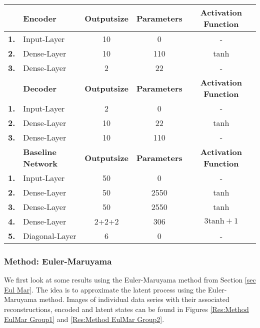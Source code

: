 \documentclass[11pt,titlepage]{article}
\theoremstyle{definition}
\theoremstyle{remark}
\begin{document}
	\begin{table}[htb]
		\begin{center}
			\begin{tabular}{llccc}
				\toprule
				\toprule
				\textbf{\ }	&\textbf{Encoder}	&\textbf{Outputsize} &\textbf{Parameters}  &\textbf{Activation Function}\\
				\midrule
				\textbf{1.}	&Input-Layer	& 10		& 0		&- \\
				\textbf{2.}	&Dense-Layer	& 10		& 110	&tanh \\
				\textbf{3.}	&Dense-Layer	& 2			& 22	&- \\
				\bottomrule
				\toprule
				\textbf{\ }	&\textbf{Decoder}	&\textbf{Outputsize} &\textbf{Parameters} &\textbf{Activation Function}\\
				\midrule
				\textbf{1.}	&Input-Layer	& 2		& 0		&- \\
				\textbf{2.}	&Dense-Layer 	& 10	& 22	&tanh \\
				\textbf{3.}	&Dense-Layer	& 10	& 110	&- \\
				\bottomrule
				\toprule
				\textbf{\ }	&\textbf{Baseline Network}	&\textbf{Outputsize} &\textbf{Parameters} &\textbf{Activation Function}\\
				\midrule
				\textbf{1.}	&Input-Layer	& 50		& 0		&- \\
				\textbf{2.}	&Dense-Layer	& 50		& 2550	&tanh \\
				\textbf{3.}	&Dense-Layer	& 50		& 2550	&tanh \\
				\textbf{4.}	&Dense-Layer	& 2+2+2		& 306	& $3\mathrm{tanh}+1$ \\
				\textbf{5.}	&Diagonal-Layer	& 6			& 0		&- \\
				\bottomrule
				\bottomrule
				
			\end{tabular}
		\end{center}
	\end{table}
	
	\subsubsection{Method: Euler-Maruyama}

	We first look at some results using the Euler-Maruyama method from Section \ref{sec Eul Mar}. The idea is to approximate the latent process using the Euler-Maruyama method. Images of individual data series with their associated reconstructions, encoded and latent states can be found in Figures \ref{Res:Method EulMar Group1} and \ref{Res:Method EulMar Group2}.
	
\end{document}
